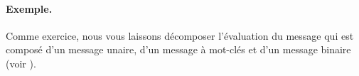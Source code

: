 \documentclass[a4paper,10pt,twoside]{book}
\begin{document}




\paragraph{Exemple.} Comme exercice, nous vous laissons d\'ecomposer
l'\'evaluation du message  qui est compos\'e
d'un message unaire, d'un message \`a mot-cl\'es et d'un message
binaire (voir ).

\end{document}
